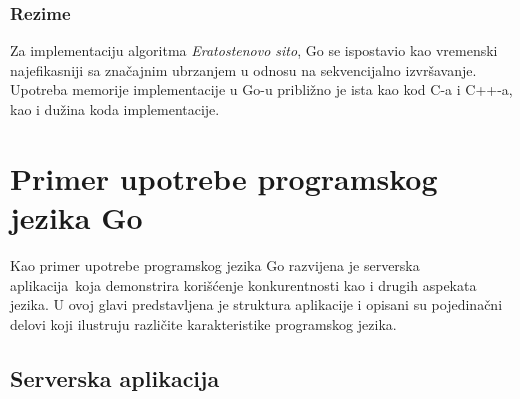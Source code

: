 \documentclass[12pt,oneside]{memoir}
\begin{document}
\subsection{Rezime}

Za implementaciju algoritma \textit{Eratostenovo sito},  Go se ispostavio kao vremenski najefikasniji sa značajnim ubrzanjem u odnosu na sekvencijalno izvršavanje. Upotreba memorije implementacije u Go-u približno je ista kao kod C-a i C++-a, kao i dužina koda implementacije.


\chapter{Primer upotrebe programskog jezika Go}\label{app}

Kao primer upotrebe programskog jezika Go razvijena je serverska aplikacija\ koja demonstrira korišćenje konkurentnosti kao i drugih aspekata jezika. U ovoj glavi predstavljena je struktura aplikacije i opisani su pojedinačni delovi koji ilustruju različite karakteristike programskog jezika. 

\section{Serverska aplikacija}
\end{document}
